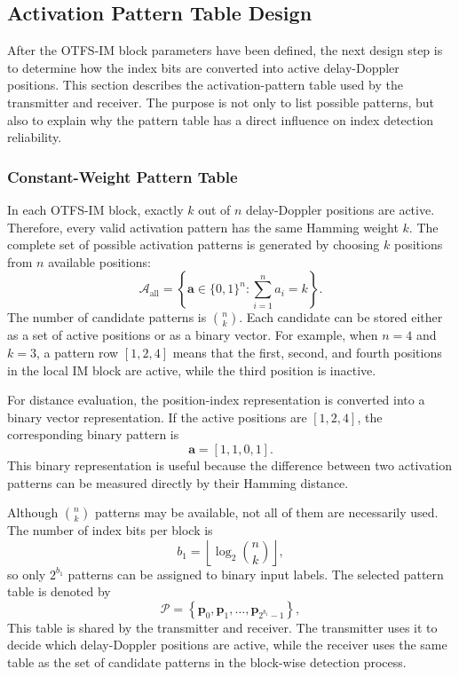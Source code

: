 \subsection{Activation Pattern Table Design}

After the OTFS-IM block parameters have been defined, the next design step is to determine how the index bits are converted into active delay-Doppler positions. This section describes the activation-pattern table used by the transmitter and receiver. The purpose is not only to list possible patterns, but also to explain why the pattern table has a direct influence on index detection reliability.

\subsubsection{Constant-Weight Pattern Table}

In each OTFS-IM block, exactly \(k\) out of \(n\) delay-Doppler positions are active. Therefore, every valid activation pattern has the same Hamming weight \(k\). The complete set of possible activation patterns is generated by choosing \(k\) positions from \(n\) available positions:
\begin{equation}
    \mathcal{A}_{\mathrm{all}}
    =
    \left\{
    \mathbf{a} \in \{0,1\}^{n}
    :
    \sum_{i=1}^{n} a_i = k
    \right\}.
    \label{eq:all_constant_weight_patterns}
\end{equation}
The number of candidate patterns is \(\binom{n}{k}\). Each candidate can be stored either as a set of active positions or as a binary vector. For example, when \(n=4\) and \(k=3\), a pattern row \([1,2,4]\) means that the first, second, and fourth positions in the local IM block are active, while the third position is inactive.

For distance evaluation, the position-index representation is converted into a binary vector representation. If the active positions are \([1,2,4]\), the corresponding binary pattern is
\begin{equation}
    \mathbf{a} = [1,1,0,1].
\end{equation}
This binary representation is useful because the difference between two activation patterns can be measured directly by their Hamming distance.

Although \(\binom{n}{k}\) patterns may be available, not all of them are necessarily used. The number of index bits per block is
\begin{equation}
    b_1 =
    \left\lfloor
    \log_2 \binom{n}{k}
    \right\rfloor ,
\end{equation}
so only \(2^{b_1}\) patterns can be assigned to binary input labels. The selected pattern table is denoted by
\begin{equation}
    \mathcal{P}
    =
    \left\{
    \mathbf{p}_0, \mathbf{p}_1, \ldots, \mathbf{p}_{2^{b_1}-1}
    \right\},
    \label{eq:selected_pattern_table}
\end{equation}
This table is shared by the transmitter and receiver. The transmitter uses it to decide which delay-Doppler positions are active, while the receiver uses the same table as the set of candidate patterns in the block-wise detection process.

